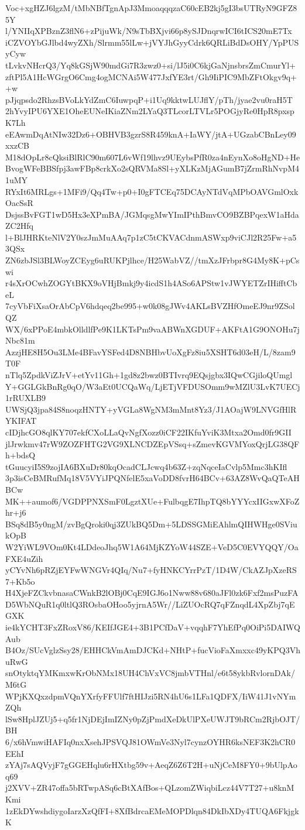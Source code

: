 Voc+xgHZJ6lgzM/tMbNBfTgnApJ3MmoaqqqzaC60cEB2kj5gI3bsUTRyN9GFZ85Y
l/YNIIqXPBznZ3flN6+zPijuWk/N9sTbBXjvi66p8ySJDnqrwICI6tICS20mE7Tx
iCZVOYbGJlbd4wyZXh/Slrmm55lLw+jVYJhGyyCdrk6QRLiBdDsOHY/YpPUSyCyw
tLvkvNHcrQ3/Yq8kGSjW90mdGi7R3zwz0+si/lJ5i0C6kjGaNjnsbrsZmCmurYl+
zftPl5A1HcWGrgO6Cmg4ogMCNAi5W477JxfYE3rt/Gh9IiPIC9MbZFtOkgv9q++w
pJjqpsdo2RhzsBVoLkYdZmC6IuwpqP+i1Uq9kktwLUJflY/pTh/jyae2vu0raH5T
2hYvyIPU6YXE1OheEUNeIKiaZNm2LYaQ3TLcorLTVLr5POGjyRe0HpR8pxspK7Lh
eEAwmDqAtNIw32Dz6+OBHVB3gzrS8R459knA+IaWY/jtA+UGzabCBnLey09xxzCB
M18dOpLr8cQksiBlRlC90m607L6vWf19lhvz9UEybsPfR0za4nEynXo8oHgND+He
BvogWFeBBSfpj3awFBp8crkXo2sQRVMa8Sl+yXLKzMjAGumB7jZrmRhNvpM41uMY
RYxIt6MRLgs+1MFi9/Qq4Tw+p0+I0gFTCEq75DCAyNTdVqMPbOAVGmlOxkOacSsR
DsjssBvFGT1wD5Hx3eXPmBA/JGMqsgMwYImIPthBmvCO9BZBPqexW1aHdaZC2Hfq
l+BlJHRKteNlV2Y0szJmMuAAq7p1zC5tCKVACdnmASWxp9viCJl2R25Fw+a53QSx
ZN6zbJSl3BLWoyZCEyg6uRUKPjlhce/H25WabVZ//tmXzJFrbpr8G4My8K+pCswi
r4sXrOCwhZOGYtBKX9oVHjBmkj9y4icdS1h4ASo6APStw1vJWYETZrIHifftCbeL
7cyVbFiXsaOrAbCpV6hdqeq2be995+w0k08gJWv4AKLsBVZHfOmeEJ9nr9ZSolQZ
WX/6xPPoE4mbkOlldlfPe9K1LKTsPm9vaABWnXGDUF+AKFtA1G9ONOHu7jNbc81m
AzzjHE8H5Ou3LMe4BFavYSFed4D8NBHbvUoXgFz8iu5XSHT6d03eH/L/8zam9T0F
nTlq5ZpdkViZJrV+etYv11Gh+1gd8z2bwz0BTIvrq9EQsjgbx3IQwCGjiloQUmgl
Y+GGLGkBnRg0qO/W3aEt0UCQaWq/LjETjVFDUSOmm9wMZlU3LvK7UECj1rRUXLB9
UWSjQ3jpa84S8noqzHNTY+yVGLa8WgNM3mMnt8Yz3/J1AOajW9LNVGfHlRYKIFAT
cIDjhcGO8qlKY707ekfCXoLLaQvNgfXozz0iCF22IKfuYviK3Mtxa2Omd0fr9GII
jlJrwkmv47rW9ZOZFHTG2VG9XLNCDZEpVSsq+sZmevKGVMYoxQrjLG38QFh+bdsQ
tGuucyiI5S9zojIA6BXuDr80kqOcadCLJcwq4b63Z+zqNqceIaCvlp5Mmc3hKIfl
3p3isCeBMRufMq18V5VYiJPQNfelE5xaVoDD8fvrH64BCv+63AZ8WvQaQTeAHBCw
MK++aumof6/VGDPPNXSmF0LgztXUe+FulbqgE7IhpTQ8bYYYcxIIGxwXFoZhr+j6
BSq8dB5y0ngM/zvBgQroki0qj3ZUkBQ5Dm+5LDSSGMiEAhlmQIHWHge0SViukOpB
W2YiWL9VOm0Kt4LDdeoJhq5W1A64MjKZYoW44SZE+VeD5C0EVYQQY/OaFXE4uZih
yCYvNh6pRZjEYFwWNGVr4QIq/Nu7+fyHNKCYrrPzT/1D4W/CkAZJpXzeRS7+Kb5o
H4XjeFZCkvbnasaCWnkB2lOBj0CqE9IGJ6o1Nww88v680aJFl0zk6Fxf2msPuzFA
D5WbNQuR1q0ltlQ3ROsbaOHoo5yjrnA5Wr//LiZUOcRQ7qFZnqdL4XpZbj7qEGXK
ie4kYCHT3FxZRoxV86/KEIfJGE4+3B1PCfDaV+vqqhF7YhEfPq0OiPi5DAIWQAub
B4Oz/SUcVglzSsy28/EHHCkVmAmDJCKd+NHtP+fucVioFaXmxxc49yKPQ3VhuRwG
snOtyktqYMKmxwKrObNMx18UH4ChVxVC8jmbVTHnl/e6t58ykbRvlornDAk/M6tG
WPjKXQxzdpmVQnYXrfyFFUlf7ftHIJzi5RN4hU6s1LFa1QDFX/IiW41J1vNYmZQh
lSw8HplJZUj5+q5fr1NjDEjImIZNy0pZjPmdXeDkUlPXeUWJT9bRCm2RjbOJT/BH
6/x6hVmwiHAFIq0nxXsehJPSVQJ81OWmVe3Nyl7cynzOYHR6ksNEF3K2hCR0EEhI
zYAj7sAQVyjF7gGGEHqlu6rHXtbg59v+AeqZ6Z6T2H+uNjCeM8FY0+9bUlpAoq69
j2XVV+ZR47offa5bRTwpASq6cBtXAfBos+QLzomZWiqbiLcz44V7T27+u8knMKmi
1zEkDYwshdiygoIarzXzQfFI+8XfBdrcaEMeMOPDlqn84DkIbXDy4TUQA6FkjgkK
